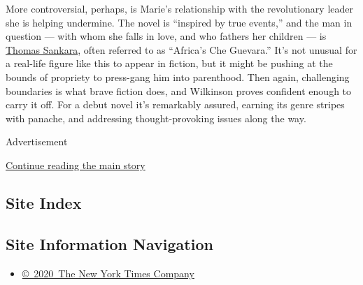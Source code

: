More controversial, perhaps, is Marie's relationship with the
revolutionary leader she is helping undermine. The novel is ``inspired
by true events,'' and the man in question --- with whom she falls in
love, and who fathers her children --- is
\href{https://www.nytimes3xbfgragh.onion/1989/11/01/world/a-west-african-land-s-new-name-brings-it-little-relief-from-old-troubles.html}{Thomas
Sankara}, often referred to as ``Africa's Che Guevara.'' It's not
unusual for a real-life figure like this to appear in fiction, but it
might be pushing at the bounds of propriety to press-gang him into
parenthood. Then again, challenging boundaries is what brave fiction
does, and Wilkinson proves confident enough to carry it off. For a debut
novel it's remarkably assured, earning its genre stripes with panache,
and addressing thought-provoking issues along the way.

Advertisement

\protect\hyperlink{after-bottom}{Continue reading the main story}

\hypertarget{site-index}{%
\subsection{Site Index}\label{site-index}}

\hypertarget{site-information-navigation}{%
\subsection{Site Information
Navigation}\label{site-information-navigation}}

\begin{itemize}
\tightlist
\item
  \href{https://help.nytimes3xbfgragh.onion/hc/en-us/articles/115014792127-Copyright-notice}{©~2020~The
  New York Times Company}
\end{itemize}

